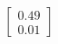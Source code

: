 \documentclass[preview]{standalone}
\begin{document}
\begin{align*}
\begin{bmatrix} 0.49 \\ 0.01 \end{bmatrix}
\end{align*}
\end{document}
